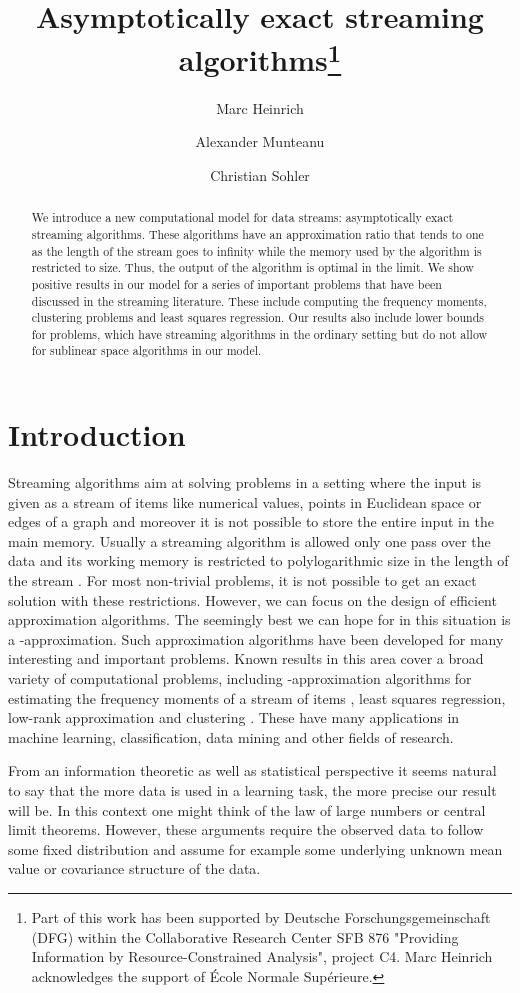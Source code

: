 \documentclass[a4paper,11pt,oneside,english,onecolumn]{article}
\title{Asymptotically exact streaming algorithms\thanks{Part of this work has been supported by Deutsche Forschungsgemeinschaft (DFG) within the Collaborative Research Center SFB 876 "Providing Information by Resource-Constrained Analysis",
project C4. Marc Heinrich acknowledges the support of \'Ecole Normale Sup\'erieure.}}
\author[1]{Marc Heinrich}
\affil[1]{D\'epartement d'Informatique,\authorcr
\'Ecole Normale Sup\'erieure, Paris, France\authorcr
		  \texttt{marc.heinrich@ens.fr}
}
\author[2]{Alexander Munteanu}
\author[2]{Christian Sohler}
\affil[2]{Department of Computer Science, TU Dortmund, Germany\authorcr
		  \texttt{\{alexander.munteanu,christian.sohler\}@tu-dortmund.de}
}
\theoremstyle{definition}
\begin{document}
\maketitle
\thispagestyle{empty}
\begin{abstract}
\noindent
We introduce a new computational model for data streams: asymptotically exact streaming algorithms. These algorithms have an approximation ratio that tends to one as the length of the stream goes to infinity while the memory used by the algorithm is restricted to  size. Thus, the output of the algorithm is optimal in the limit. We show positive results in our model for a series of important problems that have been discussed in the streaming literature. These include computing the frequency moments, clustering problems and least squares regression. Our results also include lower bounds for problems, which have streaming algorithms in the ordinary setting but do not allow for sublinear space algorithms in our model.\\

\noindent
\end{abstract}

\section{Introduction}
Streaming algorithms aim at solving problems in a setting where the input is given as a stream of items like numerical values, points in Euclidean space or edges of a graph and moreover it is not possible to store the entire input in the main memory. Usually a streaming algorithm is allowed only one pass over the data and its working memory is restricted to polylogarithmic size in the length of the stream \cite{Muthukrishnan05}. For most non-trivial problems, it is not possible to get an exact solution with these restrictions. However, we can focus on the design of efficient approximation algorithms. The seemingly best we can hope for in this situation is a -approximation. Such approximation algorithms have been developed for many interesting and important problems. Known results in this area cover a broad variety of computational problems, including -approximation algorithms for estimating the frequency moments of a stream of items \cite{ApproxFreqMom}, least squares regression, low-rank approximation \cite{LinAlgStream} and clustering \cite{ClusteringMotion}. These have many applications in machine learning, classification, data mining and other fields of research.

From an information theoretic as well as statistical perspective it seems natural to say that the more data is used in a learning task, the more precise our result will be. In this context one might think of the law of large numbers or central limit theorems. However, these arguments require the observed data to follow some fixed distribution and assume for example some underlying unknown mean value or covariance structure of the data.
\end{document}
